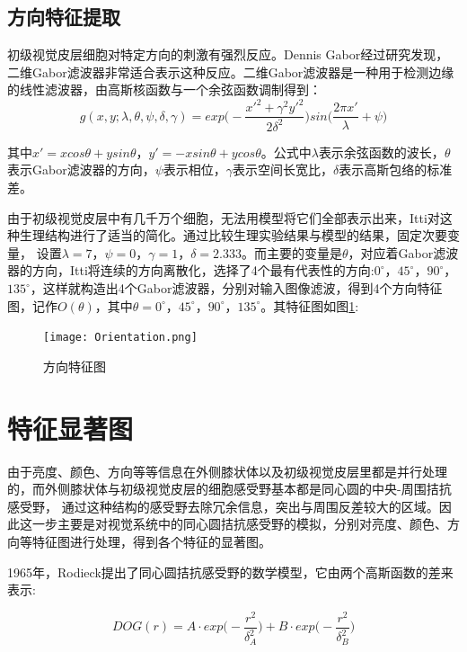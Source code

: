 \documentclass[a4paper,10pt]{article}\large
\begin{document}
\subsection{方向特征提取}

初级视觉皮层细胞对特定方向的刺激有强烈反应。Dennis Gabor经过研究发现，二维Gabor滤波器非常适合表示这种反应。二维Gabor滤波器是一种用于检测边缘的线性滤波器，由高斯核函数与一个余弦函数调制得到：
\begin{equation}
g(x,y;\lambda,\theta,\psi,\delta,\gamma)=exp\Big(-\frac{x'^2+\gamma^2y'^2}{2\delta^2}\Big)sin\big(\frac{2\pi x'}{\lambda}+\psi\big)
\end{equation}


其中$x'=xcos\theta+ysin\theta$，$y'=-xsin\theta+ycos\theta$。公式中$\lambda$表示余弦函数的波长，$\theta$表示Gabor滤波器的方向，$\psi$表示相位，$\gamma$表示空间长宽比，$\delta$表示高斯包络的标准差。


由于初级视觉皮层中有几千万个细胞，无法用模型将它们全部表示出来，Itti对这种生理结构进行了适当的简化。通过比较生理实验结果与模型的结果，固定次要变量，
设置$\lambda=7$，$\psi=0$，$\gamma=1$，$\delta=2.333$。而主要的变量是$\theta$，对应着Gabor滤波器的方向，Itti将连续的方向离散化，选择了4个最有代表性的方向:$0^\circ$，$45^\circ$，$90^\circ$，$135^\circ$，这样就构造出4个Gabor滤波器，分别对输入图像滤波，得到4个方向特征图，记作$O(\theta)$，其中$\theta=0^\circ，45^\circ，90^\circ，135^\circ$。其特征图如图\ref{fig:4}:
\begin{figure}[!htb]
\centering
\texttt{[image: Orientation.png]}
\caption{方向特征图}\label{fig:4} 
\end{figure}

\section{特征显著图}

由于亮度、颜色、方向等等信息在外侧膝状体以及初级视觉皮层里都是并行处理的，而外侧膝状体与初级视觉皮层的细胞感受野基本都是同心圆的中央-周围拮抗感受野，
通过这种结构的感受野去除冗余信息，突出与周围反差较大的区域。因此这一步主要是对视觉系统中的同心圆拮抗感受野的模拟，分别对亮度、颜色、方向等特征图进行处理，得到各个特征的显著图。


1965年，Rodieck提出了同心圆拮抗感受野的数学模型\cite{6:article}，它由两个高斯函数的差来表示:

\begin{equation}
DOG(r)=A\cdot exp\Big(-\frac{r^2}{\delta_{A}^{2}}\Big)+B\cdot exp\Big(-\frac{r^2}{\delta_{B}^{2}}\Big)
\end{equation}
\end{document}
